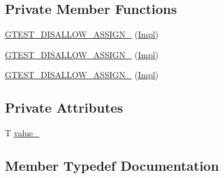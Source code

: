 \subsection*{Private Member Functions}
\begin{DoxyCompactItemize}
\item 
\mbox{\hyperlink{classtesting_1_1internal_1_1_return_ref_of_copy_action_1_1_impl_a380485fdbcb248ca267bf190202607c5}{G\+T\+E\+S\+T\+\_\+\+D\+I\+S\+A\+L\+L\+O\+W\+\_\+\+A\+S\+S\+I\+G\+N\+\_\+}} (\mbox{\hyperlink{classtesting_1_1internal_1_1_return_ref_of_copy_action_1_1_impl}{Impl}})
\item 
\mbox{\hyperlink{classtesting_1_1internal_1_1_return_ref_of_copy_action_1_1_impl_a380485fdbcb248ca267bf190202607c5}{G\+T\+E\+S\+T\+\_\+\+D\+I\+S\+A\+L\+L\+O\+W\+\_\+\+A\+S\+S\+I\+G\+N\+\_\+}} (\mbox{\hyperlink{classtesting_1_1internal_1_1_return_ref_of_copy_action_1_1_impl}{Impl}})
\item 
\mbox{\hyperlink{classtesting_1_1internal_1_1_return_ref_of_copy_action_1_1_impl_a380485fdbcb248ca267bf190202607c5}{G\+T\+E\+S\+T\+\_\+\+D\+I\+S\+A\+L\+L\+O\+W\+\_\+\+A\+S\+S\+I\+G\+N\+\_\+}} (\mbox{\hyperlink{classtesting_1_1internal_1_1_return_ref_of_copy_action_1_1_impl}{Impl}})
\end{DoxyCompactItemize}
\subsection*{Private Attributes}
\begin{DoxyCompactItemize}
\item 
T \mbox{\hyperlink{classtesting_1_1internal_1_1_return_ref_of_copy_action_1_1_impl_ad253b5cad2707636b8b19970708905c3}{value\+\_\+}}
\end{DoxyCompactItemize}


\subsection{Member Typedef Documentation}
\mbox{\label{classtesting_1_1internal_1_1_return_ref_of_copy_action_1_1_impl_aae70fc272cfaa8efebffffdeaca36cea}} 
